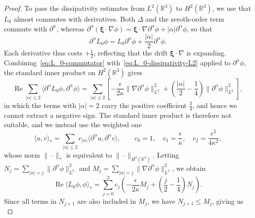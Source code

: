 \documentclass[11pt]{article}
\DeclareMathOperator{\real}{Re}
\begin{document}
\begin{proof}
  To pass the dissipativity estimates from \(L^{2}(\mathbb{R}^{3})\)
  to \(H^{2}(\mathbb{R}^{3})\), we use that \(L_{0}\) almost commutes
  with derivatives. Both \(\Delta\) and the zeroth-order term commute
  with \(\partial^{\alpha}\), whereas
  \(\partial^{\alpha}(\bm{\xi} \cdot \nabla\phi) = \bm{\xi} \cdot
  \nabla\partial^{\alpha}\phi + |\alpha|\partial^{\alpha}\phi\), so
  that
  \begin{equation}\label{eq:L_0-commutator}
    \partial^{\alpha}L_{0}\phi = L_{0}\partial^{\alpha}\phi + \frac{|\alpha|}{2}\partial^{\alpha}\phi.
  \end{equation}
  Each derivative thus costs \(+\frac{1}{2}\), reflecting that the
  drift \(\bm{\xi} \cdot \nabla\) is expanding.
  Combining~\eqref{eq:L_0-commutator} with~\eqref{eq:L_0-dissipativity-L2}
  applied to \(\partial^{\alpha}\phi\), the standard inner product on
  \(H^{2}(\mathbb{R}^{3})\) gives
  \begin{equation*}
    \real \sum_{|\alpha| \leq 2} \langle \partial^{\alpha}L_{0}\phi, \partial^{\alpha}\phi\rangle
    = \sum_{|\alpha| \leq 2}\left[
      -\frac{\epsilon}{2\kappa}\|\nabla\partial^{\alpha}\phi\|_{L^{2}}^{2}
      + \left(\frac{|\alpha|}{2} - \frac{1}{4}\right)\|\partial^{\alpha}\phi\|_{L^{2}}^{2}
    \right],
  \end{equation*}
  in which the terms with \(|\alpha| = 2\) carry the positive
  coefficient \(\frac{3}{4}\), and hence we cannot extract a negative
  sign. The standard inner product is therefore not suitable, and we
  instead use the weighted one
  \begin{equation*}
    \langle u, v\rangle_{*} = \sum_{|\alpha| \leq 2} c_{|\alpha|}\langle \partial^{\alpha}u, \partial^{\alpha}v\rangle,
    \qquad c_{0} = 1,\quad c_{1} = \frac{\epsilon}{\kappa},\quad c_{2} = \frac{\epsilon^{2}}{4\kappa^{2}},
  \end{equation*}
  whose norm \(\|\cdot\|_{*}\) is equivalent to
  \(\|\cdot\|_{H^{2}(\mathbb{R}^{3})}\). Letting
  \(N_{j} = \sum_{|\alpha| = j}\|\partial^{\alpha}\phi\|_{L^{2}}^{2}\)
  and
  \(M_{j} = \sum_{|\alpha| =
    j}\|\nabla\partial^{\alpha}\phi\|_{L^{2}}^{2}\), we obtain
  \begin{equation*}
    \real \langle L_{0}\phi, \phi\rangle_{*}
    = \sum_{j = 0}^{2}c_{j}\left(-\frac{\epsilon}{2\kappa} M_{j} + \left(\frac{j}{2} - \frac{1}{4}\right)N_{j}\right).
  \end{equation*}
  Since all terms in \(N_{j + 1}\) are also included in \(M_{j}\), we
  have \(N_{j + 1} \leq M_{j}\), giving us
  \begin{equation}\label{eq:L_0-dissipativity-H2}

\end{equation}
\end{proof}
\end{document}
